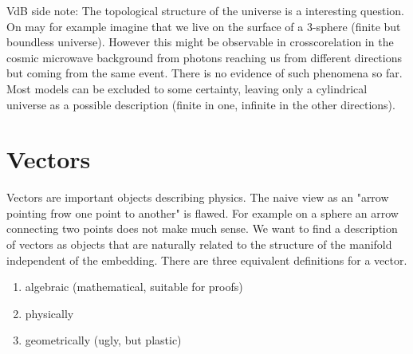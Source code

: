 VdB side note: The topological structure of the universe is a interesting question.  On may for example imagine that we live on the surface of a 3-sphere (finite but boundless universe). However this might be observable in crosscorelation in the cosmic microwave background from photons reaching us from different directions but coming from the same event. There is no evidence of such phenomena so far. Most models can be excluded to some certainty, leaving only a cylindrical universe as a possible description (finite in one, infinite in the other directions).
\section{Vectors}
Vectors are important objects describing physics. The naive view as an "arrow pointing frow one point to another" is flawed. For example on a sphere an arrow connecting two points does not make much sense.
We want to find a description of vectors as objects that are naturally related to the structure of the manifold independent of the embedding.
There are three equivalent definitions for a vector.
\begin{enumerate}
    \item algebraic (mathematical, suitable for proofs)
    \item physically
    \item geometrically (ugly, but plastic)
\end{enumerate}
